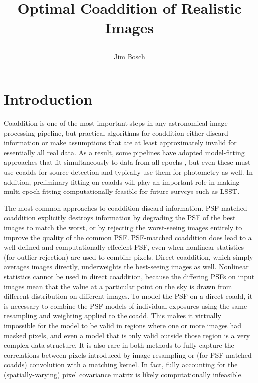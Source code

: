 \documentclass[10pt]{article}
\title{Optimal Coaddition of Realistic Images\\
{\author{Jim Bosch}}}
\begin{document}
\newcommand{\sinc}[3]{
\ensuremath{
    \frac{
        \sin\left(\frac{\pi}{#3}[{#1} - {#2}{#3}]\right)
    } {
        \frac{\pi}{#3}({#1} - {#2}{#3})
    }
}}

\maketitle

\section{Introduction}

Coaddition is one of the most important steps in any astronomical image processing pipeline, but practical algorithms for coaddition either discard information or make assumptions that are at least approximately invalid for essentially all real data.  As a result, some pipelines have adopted model-fitting approaches that fit simultaneously to data from all epochs \citep{2013MNRAS.429.2858M,2014MNRAS.444L..25S,2014ascl.soft09013Z}, but even these must use coadds for source detection and typically use them for photometry as well.  In addition, preliminary fitting on coadds will play an important role in making multi-epoch fitting computationally feasible for future surveys such as LSST.

The most common approaches to coaddition discard information.  PSF-matched coaddition explicitly destroys information by degrading the PSF of the best images to match the worst, or by rejecting the worst-seeing images entirely to improve the quality of the common PSF.  PSF-matched coaddition does lead to a well-defined and computationally effecient PSF, even when nonlinear statistics (for outlier rejection) are used to combine pixels.  Direct coaddition, which simply averages images directly, underweights the best-seeing images as well.  Nonlinear statistics cannot be used in direct coaddition, because the differing PSFs on input images mean that the value at a particular point on the sky is drawn from different distribution on different images.  To model the PSF on a direct coadd, it is necessary to combine the PSF models of individual exposures using the same resampling and weighting applied to the coadd.  This makes it virtually impossible for the model to be valid in regions where one or more images had masked pixels, and even a model that is only valid outside those region is a very complex data structure.  It is also rare in both methods to fully capture the correlations between pixels introduced by image resampling or (for PSF-matched coadds) convolution with a matching kernel.  In fact, fully accounting for the (spatially-varying) pixel covariance matrix is likely computationally infeasible.
\end{document}
